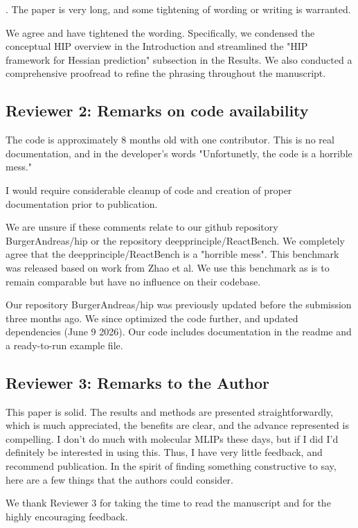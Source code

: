 \documentclass[11pt,letterpaper]{article}
\begin{document}
. The paper is very long, and some tightening of wording or writing is warranted.


{\color{responsecolour}
\noindent We agree and have tightened the wording. Specifically, we condensed the conceptual HIP overview in the Introduction and streamlined the "HIP framework for Hessian prediction" subsection in the Results. We also conducted a comprehensive proofread to refine the phrasing throughout the manuscript.
}

\subsection*{Reviewer 2: Remarks on code availability}
The code is approximately 8 months old with one contributor. This is no real documentation, and in the developer's words "Unfortunetly, the code is a horrible mess."

I would require considerable cleanup of code and creation of proper documentation prior to publication.

{\color{responsecolour}
\noindent We are unsure if these comments relate to our github repository BurgerAndreas/hip or the repository deepprinciple/ReactBench. We completely agree that the deepprinciple/ReactBench is a "horrible mess". This benchmark was released based on work from Zhao et al. We use this benchmark as is to remain comparable but have no influence on their codebase.

Our repository BurgerAndreas/hip was previously updated before the submission three months ago. We since optimized the code further, and updated dependencies (June 9 2026). Our code includes documentation in the readme and a ready-to-run example file.
}


\subsection*{Reviewer 3: Remarks to the Author}
This paper is solid. The results and methods are presented straightforwardly, which is much appreciated, the benefits are clear, and the advance represented is compelling. I don’t do much with molecular MLIPs these days, but if I did I’d definitely be interested in using this. Thus, I have very little feedback, and recommend publication. In the spirit of finding something constructive to say, here are a few things that the authors could consider.

{\color{responsecolour}
\noindent We thank Reviewer 3 for taking the time to read the manuscript and for the highly encouraging feedback.
}
\vspace{1mm}
\end{document}
